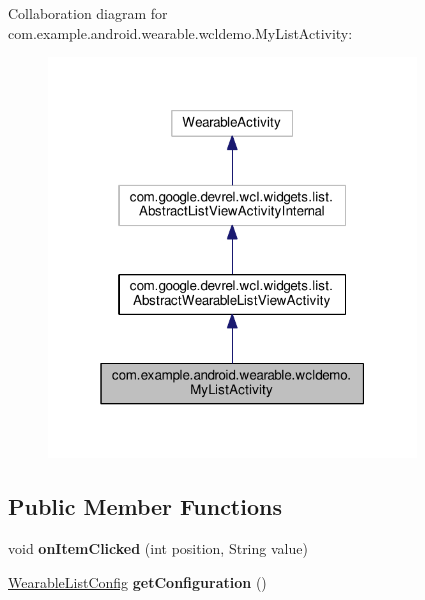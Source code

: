 Collaboration diagram for com.\+example.\+android.\+wearable.\+wcldemo.\+My\+List\+Activity\+:
\nopagebreak
\begin{figure}[H]
\begin{center}
\leavevmode
\includegraphics[width=277pt]{db/d4b/classcom_1_1example_1_1android_1_1wearable_1_1wcldemo_1_1MyListActivity__coll__graph}
\end{center}
\end{figure}
\subsection*{Public Member Functions}
\begin{DoxyCompactItemize}
\item 
void {\bfseries on\+Item\+Clicked} (int position, String value)\hypertarget{classcom_1_1example_1_1android_1_1wearable_1_1wcldemo_1_1MyListActivity_a399a7ccb7a66ef28df4d601f21095b25}{}\label{classcom_1_1example_1_1android_1_1wearable_1_1wcldemo_1_1MyListActivity_a399a7ccb7a66ef28df4d601f21095b25}

\item 
\hyperlink{classcom_1_1google_1_1devrel_1_1wcl_1_1widgets_1_1list_1_1WearableListConfig}{Wearable\+List\+Config} {\bfseries get\+Configuration} ()\hypertarget{classcom_1_1example_1_1android_1_1wearable_1_1wcldemo_1_1MyListActivity_a0566083fd4b31bd9daa85ba32cd279e2}{}\label{classcom_1_1example_1_1android_1_1wearable_1_1wcldemo_1_1MyListActivity_a0566083fd4b31bd9daa85ba32cd279e2}

\end{DoxyCompactItemize}
